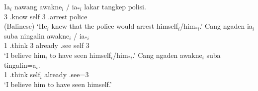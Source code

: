 \documentclass[output=paper
 	        ,biblatex
                ,babelshorthands
                ,newtxmath
                ,draftmode
                ,colorlinks, citecolor=brown
]{langscibook}
\begin{document}
\eal
\label{bal}
%
\ex\label{bal-a}
\gll Ia$_{i}$ nawang       awakne$_{i}$ / ia$_{*i}$  lakar    tangkep        polisi. \\
     3        .know self        {} 3                    .arrest police  \\\hfill(Balinese)
\glt `He$_{i}$ knew that the police would arrest himself$_{i}$/him$_{*i}$.'
\ex\label{bal-b}
\gll Cang      ngaden        ia$_{i}$ suba     ningalin   awakne$_{i}$ / ia$_{*i}$ \\
     1 .think 3        already .see self        {} 3 \\
\glt `I believe him$_{i}$ to have seen himself$_{i}$/him$_{*i}$.'
\ex\label{bal-c}
\gll Cang ngaden        awakne$_{i}$ suba    tingalin=a$_{i}$.\\
     1    .think self$_{i}$   already .see=3 \\
\glt `I believe him to have seen himself.'
\zl
\end{document}

